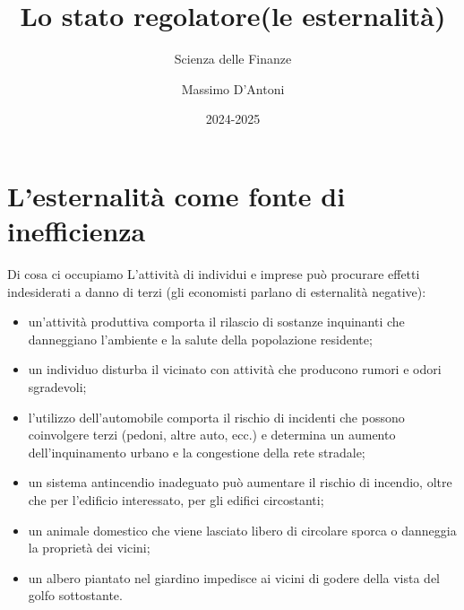 \documentclass[aspectratio=64,12pt]{beamer}
\institute{Università di Siena}
\author{Massimo D'Antoni}
\date{2024-2025}
\title{Lo stato regolatore\newline (le esternalità)}
\subtitle{Scienza delle Finanze}
\begin{document}
\maketitle

\section{L'esternalità come fonte di inefficienza}

\begin{frame}{Di cosa ci occupiamo}
L'attività di individui e imprese può procurare \alert{effetti indesiderati a danno
di terzi} (gli economisti parlano di \alert{esternalità negative}):
\begin{itemize}
\item un’attività produttiva comporta il rilascio di sostanze inquinanti che
danneggiano l’ambiente e la salute della popolazione residente;
\item un individuo disturba il vicinato con attività che producono rumori e odori
sgradevoli;
\item l’utilizzo dell’automobile comporta il rischio di incidenti che possono
coinvolgere terzi (pedoni, altre auto, ecc.) e determina un aumento dell’inquinamento
urbano e la congestione della rete stradale;
\item un sistema antincendio inadeguato può aumentare il rischio di incendio,
oltre che per l’edificio interessato, per gli edifici circostanti;
\item un animale domestico che viene lasciato libero di circolare sporca o
danneggia la proprietà dei vicini;
\item un albero piantato nel giardino impedisce ai vicini di godere della vista
del golfo sottostante.
\end{itemize}
\end{frame}
\end{document}
